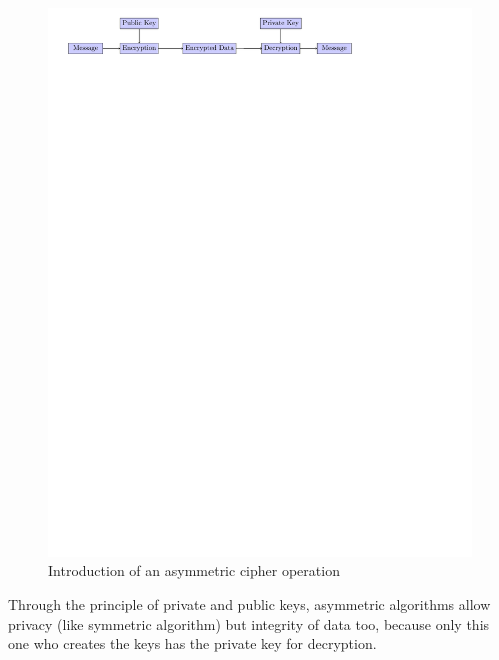 \begin{figure}[!ht]
\centering
\includegraphics[trim=1cm 25.25cm 5cm 0cm]{figures/intro_asym_cipher.pdf}
\caption{Introduction of an asymmetric cipher operation}
\label{fig:asym}
\end{figure}

Through the principle of private and public keys, asymmetric algorithms allow
privacy (like symmetric algorithm) but integrity of data too, because only this
one who creates the keys has the private key for decryption.

